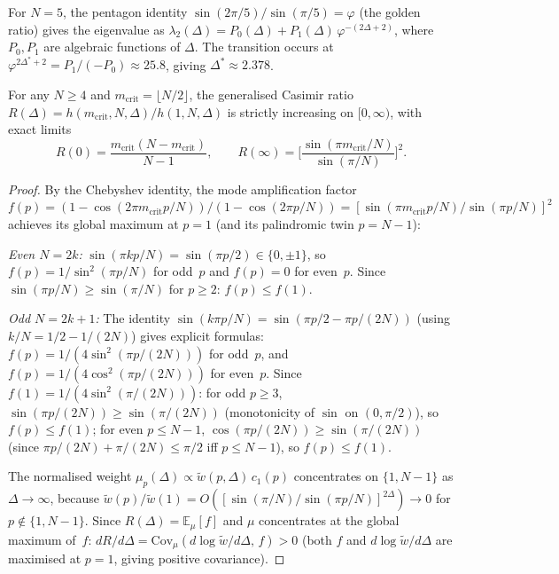 For $N = 5$, the pentagon identity
$\sin(2\pi/5)/\sin(\pi/5) = \varphi$ (the golden ratio)
gives the eigenvalue as
$\lambda_2(\Delta) = P_0(\Delta) + P_1(\Delta)\,\varphi^{-(2\Delta+2)}$,
where $P_0, P_1$ are algebraic functions of $\Delta$.
The transition occurs at $\varphi^{2\Delta^*+2} = P_1/({-P_0})
\approx 25.8$, giving $\Delta^* \approx 2.378$.

\begin{theorem}
\label{thm:rg-monotonicity}
For any $N \ge 4$ and $m_{\mathrm{crit}} = \lfloor N/2 \rfloor$,
the generalised Casimir ratio
$R(\Delta) = h(m_{\mathrm{crit}}, N, \Delta) / h(1, N, \Delta)$
is strictly increasing on $[0, \infty)$, with exact limits
\begin{equation}\label{eq:rg-limits}
  R(0) = \frac{m_{\mathrm{crit}}(N{-}m_{\mathrm{crit}})}{N{-}1},
  \qquad
  R(\infty) = \biggl[\frac{\sin(\pi m_{\mathrm{crit}}/N)}
                          {\sin(\pi/N)}\biggr]^2.
\end{equation}
\end{theorem}

\begin{proof}
By the Chebyshev identity, the mode amplification factor
$f(p) = (1{-}\cos(2\pi m_{\mathrm{crit}} p/N))/(1{-}\cos(2\pi p/N))
= [\sin(\pi m_{\mathrm{crit}} p/N)/\sin(\pi p/N)]^2$
achieves its global maximum at $p = 1$ (and its palindromic twin
$p = N{-}1$):

\emph{Even $N = 2k$:}
$\sin(\pi kp/N) = \sin(\pi p/2) \in \{0, \pm 1\}$, so
$f(p) = 1/\sin^2(\pi p/N)$ for odd~$p$ and $f(p) = 0$ for even~$p$.
Since $\sin(\pi p/N) \ge \sin(\pi/N)$ for $p \ge 2$: $f(p) \le f(1)$.

\emph{Odd $N = 2k{+}1$:}
The identity $\sin(k\pi p/N) = \sin(\pi p/2 - \pi p/(2N))$
(using $k/N = 1/2 - 1/(2N)$) gives explicit formulas:
$f(p) = 1/(4\sin^2(\pi p/(2N)))$ for odd~$p$, and
$f(p) = 1/(4\cos^2(\pi p/(2N)))$ for even~$p$.
Since $f(1) = 1/(4\sin^2(\pi/(2N)))$:
for odd $p \ge 3$, $\sin(\pi p/(2N)) \ge \sin(\pi/(2N))$
(monotonicity of $\sin$ on $(0,\pi/2)$), so $f(p) \le f(1)$;
for even $p \le N{-}1$, $\cos(\pi p/(2N)) \ge \sin(\pi/(2N))$
(since $\pi p/(2N) + \pi/(2N) \le \pi/2$ iff $p \le N{-}1$),
so $f(p) \le f(1)$.

The normalised weight $\mu_p(\Delta) \propto \tilde{w}(p,\Delta)\,c_1(p)$
concentrates on $\{1, N{-}1\}$ as $\Delta \to \infty$, because
$\tilde{w}(p)/\tilde{w}(1) = O([\sin(\pi/N)/\sin(\pi p/N)]^{2\Delta})
\to 0$ for $p \notin \{1, N{-}1\}$.
Since $R(\Delta) = \mathbb{E}_\mu[f]$ and $\mu$ concentrates at the
global maximum of~$f$:
$dR/d\Delta = \mathrm{Cov}_\mu(d\log\tilde{w}/d\Delta,\, f) > 0$
(both $f$ and $d\log\tilde{w}/d\Delta$ are maximised at $p = 1$,
giving positive covariance).
\end{proof}

